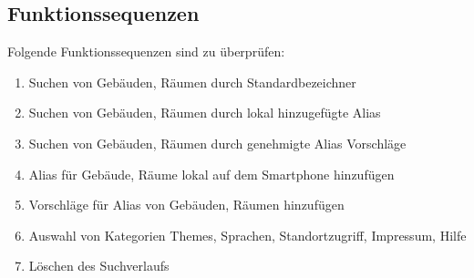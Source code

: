 \subsection{Funktionssequenzen}

Folgende Funktionssequenzen sind zu überprüfen:
\begin{enumerate}[label=\textbf{/T\arabic*0/}, align=left]
	\item Suchen von Gebäuden, Räumen durch Standardbezeichner
	\item Suchen von Gebäuden, Räumen durch lokal hinzugefügte Alias
	\item Suchen von Gebäuden, Räumen durch genehmigte Alias Vorschläge
	\item Alias für Gebäude, Räume lokal auf dem Smartphone hinzufügen
	\item Vorschläge für Alias von Gebäuden, Räumen hinzufügen
	\item Auswahl von Kategorien Themes, Sprachen, Standortzugriff, Impressum, Hilfe
	\item Löschen des Suchverlaufs
\end{enumerate}